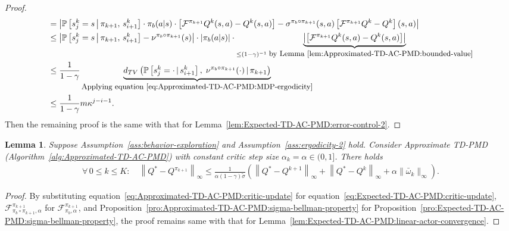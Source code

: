 \documentclass[10pt]{article}
\newcommand{\calF}{\mathcal{F}}
\renewcommand{\P}{\mathbb{P}}
\newcommand{\ls}{\left}
\newcommand{\rs}{\right}
\theoremstyle{plain}
\newtheorem{lemma}[theorem]{Lemma}
\theoremstyle{definition}
\begin{document}
\begin{proof}
\begin{align*}
        &= \ls| \P \ls[ s_j^k = s \, \big | \, \pi_{k+1}, \, s_{i+1}^k \rs] \cdot \pi_b(a|s) \cdot \ls[ \calF^{\pi_{k+1}} Q^k(s,a) - Q^k(s,a) \rs] - \sigma^{\pi_b\circ\pi_{k+1}}(s,a) \ls[ \calF^{\pi_{k+1}} Q^k - Q^k \rs](s,a) \rs| \\
        &\leq \ls| \P\ls[ s_j^k = s \, \big | \, \pi_{k+1}, \, s_{i+1}^k \rs] - \nu^{\pi_b\circ\pi_{k+1}}(s) \rs| \cdot \ls| \pi_b(a|s) \rs| \cdot \underbrace{\ls| \ls[ \calF^{\pi_{k+1}} Q^k(s,a) - Q^k(s,a) \rs] \rs|}_{\leq (1-\gamma)^{-1} \mbox{\small \;by Lemma~\ref{lem:Approximated-TD-AC-PMD:bounded-value}}} \\
        &\leq \frac{1}{1-\gamma} \underbrace{d_{TV} \ls( \P\ls[ s_j^k = \cdot \, | \, s_{i+1}^k \rs], \; \nu^{\pi_b\circ\pi_{k+1}}(\cdot) \, | \, \pi_{k+1} \rs)}_{\mbox{\small Applying equation~\eqref{eq:Approximated-TD-AC-PMD:MDP-ergodicity}}} \\
        &\leq \frac{1}{1-\gamma} m\kappa^{j-i-1}.
    \end{align*}
    Then the remaining proof is the same with that for Lemma~\ref{lem:Expected-TD-AC-PMD:error-control-2}.
\end{proof}

\begin{lemma}
    Suppose Assumption~\ref{ass:behavior-exploration} and Assumption~\ref{ass:ergodicity-2} hold. Consider Approximate TD-PMD \textup{(}Algorithm~\ref{alg:Approximated-TD-AC-PMD}\textup{)} with constant critic step size $\alpha_k = \alpha \in (0,1]$. There holds
    \begin{align*}
        \forall\, 0 \leq k \leq K: \quad \ls\| Q^* - Q^{\pi_{k+1}} \rs\|_\infty \leq  \frac{1}{\alpha(1-\gamma)\tilde\sigma} \ls( \ls\| Q^* - Q^{k+1} \rs\|_\infty + \ls\| Q^* - Q^k \rs\|_\infty + \alpha \| \bar{{\omega}}_k \|_\infty \rs).
    \end{align*}
    \label{lem:Approximated-TD-AC-PMD:linear-actor-convergence}
\end{lemma}
\begin{proof}
     By substituting equation~\eqref{eq:Approximated-TD-AC-PMD:critic-update} for equation~\eqref{eq:Expected-TD-AC-PMD:critic-update}, $\calF^{\pi_{k+1}}_{\pi_b\circ\pi_{k+1}, \alpha}$ for $\calF^{\pi_{k+1}}_{\pi_b, \alpha}$, and Proposition~\ref{pro:Approximated-TD-AC-PMD:sigma-bellman-property} for Proposition~\ref{pro:Expected-TD-AC-PMD:sigma-bellman-property}, the proof remains same with  that for Lemma~\ref{lem:Expected-TD-AC-PMD:linear-actor-convergence}.
\end{proof}
\end{document}

